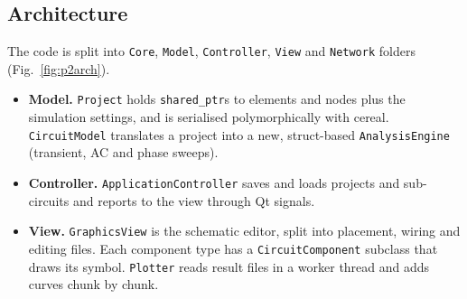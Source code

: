 \subsection{Architecture}
The code is split into \texttt{Core}, \texttt{Model}, \texttt{Controller}, \texttt{View} and \texttt{Network}
folders (Fig.~\ref{fig:p2arch}).
\begin{itemize}
  \item \textbf{Model.} \texttt{Project} holds \texttt{shared\_ptr}s to elements and nodes plus the simulation
    settings, and is serialised polymorphically with cereal. \texttt{CircuitModel} translates a project
    into a new, struct-based \texttt{AnalysisEngine} (transient, AC and phase sweeps).
  \item \textbf{Controller.} \texttt{ApplicationController} saves and loads projects and sub-circuits and
    reports to the view through Qt signals.
  \item \textbf{View.} \texttt{GraphicsView} is the schematic editor, split into placement, wiring and
    editing files. Each component type has a \texttt{CircuitComponent} subclass that draws its symbol.
    \texttt{Plotter} reads result files in a worker thread and adds curves chunk by chunk.
\end{itemize}

